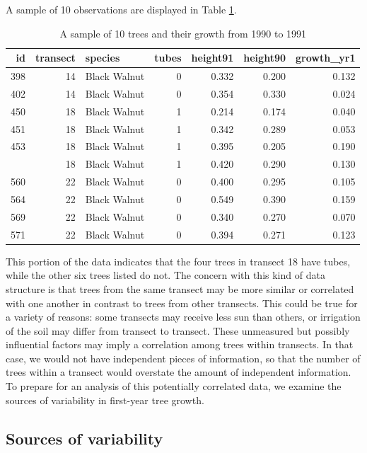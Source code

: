 \documentclass[
]{krantz}
\begin{document}
A sample of 10 observations are displayed in Table \ref{tab:treeTubeTab}.

\begin{table}

\caption{\label{tab:treeTubeTab}A sample of 10 trees and their growth from 1990 to 1991}
\centering
\begin{tabular}[t]{rrlrrrr}
\toprule
id & transect & species & tubes & height91 & height90 & growth\_yr1\\
\midrule
398 & 14 & Black Walnut & 0 & 0.332 & 0.200 & 0.132\\
402 & 14 & Black Walnut & 0 & 0.354 & 0.330 & 0.024\\
450 & 18 & Black Walnut & 1 & 0.214 & 0.174 & 0.040\\
451 & 18 & Black Walnut & 1 & 0.342 & 0.289 & 0.053\\
453 & 18 & Black Walnut & 1 & 0.395 & 0.205 & 0.190\\
\addlinespace
458 & 18 & Black Walnut & 1 & 0.420 & 0.290 & 0.130\\
560 & 22 & Black Walnut & 0 & 0.400 & 0.295 & 0.105\\
564 & 22 & Black Walnut & 0 & 0.549 & 0.390 & 0.159\\
569 & 22 & Black Walnut & 0 & 0.340 & 0.270 & 0.070\\
571 & 22 & Black Walnut & 0 & 0.394 & 0.271 & 0.123\\
\bottomrule
\end{tabular}
\end{table}

This portion of the data indicates that the four trees in transect 18 have tubes, while the other six trees listed do not. The concern with this kind of data structure is that trees from the same transect may be more similar or correlated with one another in contrast to trees from other transects. This could be true for a variety of reasons: some transects may receive less sun than others, or irrigation of the soil may differ from transect to transect. These unmeasured but possibly influential factors may imply a correlation among trees within transects. In that case, we would not have independent pieces of information, so that the number of trees within a transect would overstate the amount of independent information. To prepare for an analysis of this potentially correlated data, we examine the sources of variability in first-year tree growth.

\hypertarget{sources-of-variability-1}{%
\subsection{Sources of variability}\label{sources-of-variability-1}}
\end{document}
